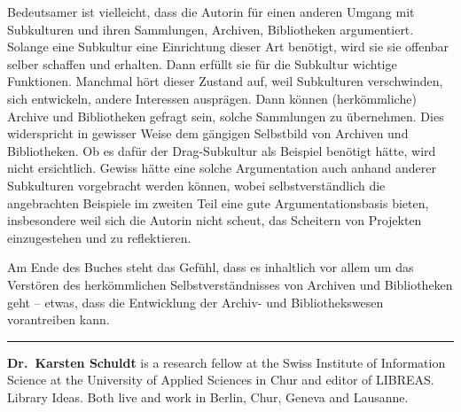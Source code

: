 \documentclass[a4paper,
fontsize=11pt,
oneside,
numbers=noperiodatend,
parskip=half-,
bibliography=totoc,
final
]{scrartcl}
\begin{document}
Bedeutsamer ist vielleicht, dass die Autorin für einen anderen Umgang
mit Subkulturen und ihren Sammlungen, Archiven, Bibliotheken
argumentiert. Solange eine Subkultur eine Einrichtung dieser Art
benötigt, wird sie sie offenbar selber schaffen und erhalten. Dann
erfüllt sie für die Subkultur wichtige Funktionen. Manchmal hört dieser
Zustand auf, weil Subkulturen verschwinden, sich entwickeln, andere
Interessen ausprägen. Dann können (herkömmliche) Archive und
Bibliotheken gefragt sein, solche Sammlungen zu übernehmen. Dies
widerspricht in gewisser Weise dem gängigen Selbstbild von Archiven und
Bibliotheken. Ob es dafür der Drag-Subkultur als Beispiel benötigt
hätte, wird nicht ersichtlich. Gewiss hätte eine solche Argumentation
auch anhand anderer Subkulturen vorgebracht werden können, wobei
selbstverständlich die angebrachten Beispiele im zweiten Teil eine gute
Argumentationsbasis bieten, insbesondere weil sich die Autorin nicht
scheut, das Scheitern von Projekten einzugestehen und zu reflektieren.

Am Ende des Buches steht das Gefühl, dass es inhaltlich vor allem um das
Verstören des herkömmlichen Selbstverständnisses von Archiven und
Bibliotheken geht -- etwas, dass die Entwicklung der Archiv- und
Bibliothekswesen vorantreiben kann.

\begin{center}\rule{0.5\linewidth}{\linethickness}\end{center}

\textbf{Dr.~Karsten Schuldt} is a research fellow at the Swiss Institute
of Information Science at the University of Applied Sciences in Chur and
editor of LIBREAS. Library Ideas. Both live and work in Berlin, Chur,
Geneva and Lausanne.
\end{document}
